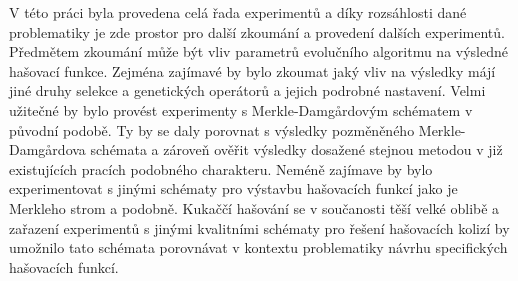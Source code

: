 V této práci byla provedena celá řada experimentů a díky rozsáhlosti dané problematiky je zde prostor pro další zkoumání
a provedení dalších experimentů. Předmětem zkoumání může být  vliv parametrů evolučního algoritmu na výsledné hašovací funkce.
Zejména zajímavé by bylo zkoumat jaký vliv na výsledky májí jiné druhy selekce a genetických operátorů a jejich podrobné nastavení.
Velmi užitečné
by bylo provést experimenty s Merkle-Damg\r{a}rdovým schématem v původní podobě. Ty by se daly porovnat s výsledky
pozměněného Merkle-Damg\r{a}rdova schémata a zároveň ověřit výsledky dosažené stejnou metodou v již existujících
pracích podobného charakteru. Neméně zajímave by bylo experimentovat s jinými schématy pro výstavbu hašovacích funkcí
jako je Merkleho strom a podobně. Kukaččí hašování se v součanosti těší velké oblibě a zařazení experimentů s jinými kvalitními
schématy pro řešení hašovacích kolizí by umožnilo tato schémata porovnávat v kontextu problematiky návrhu specifických hašovacích
funkcí.
